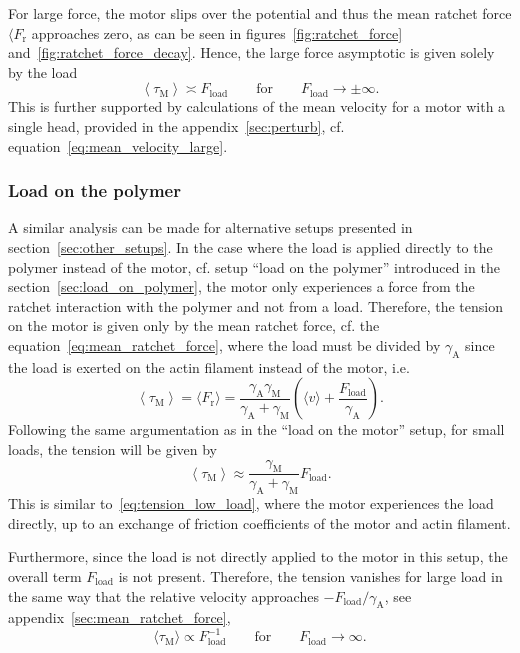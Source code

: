 \documentclass[aps,pre,twocolumn,showpacs,showkeys,superscriptaddress,floatfix]{revtex4-1}
\begin{document}
For large force, the motor slips over the potential and thus the mean ratchet force $\langle F_\text{r}$ approaches zero,
as can be seen in figures~\ref{fig:ratchet_force} and~\ref{fig:ratchet_force_decay}.
Hence, the large force asymptotic is given solely by the load
\begin{equation}
\left\langle \tau_\text{M} \right\rangle
\asymp F_\text{load} 
\qquad \text{for} \qquad F_\text{load} \to \pm \infty. 
\label{eq:tension_large_load}
\end{equation}
This is further supported by calculations of the mean velocity for a motor with a single head, provided in the appendix~\ref{sec:perturb}, cf. equation~\eqref{eq:mean_velocity_large}.


\subsubsection{Load on the polymer}
A similar analysis can be made for alternative setups presented in section~\ref{sec:other_setups}. 
In the case where the load is applied directly to the polymer instead of the motor, cf. setup ``load on the polymer'' introduced in the section~\ref{sec:load_on_polymer}, 
the motor only experiences a force from the ratchet interaction with the polymer and not from a load. 
Therefore, the tension on the motor is given only by the mean ratchet force,  
cf. the equation~\eqref{eq:mean_ratchet_force},  
where the load must be divided by $\gamma_\text{A}$ since the load is exerted on the actin filament instead of the motor,
i.e.
\begin{equation}
\left\langle \tau_\text{M} \right\rangle 
= \langle F_\text{r} \rangle 
= \frac{\gamma_\text{A}\gamma_\text{M}}{\gamma_\text{A} + \gamma_\text{M} } \left(\langle v \rangle + \frac{F_\text{load}}{\gamma_\text{A}}\right) . 
\label{eq:tension_load_on_polymer}
\end{equation}
Following the same argumentation as in the ``load on the motor'' setup, for small loads, the tension will be given by
\begin{equation}
\left\langle \tau_\text{M} \right\rangle
\approx \frac{\gamma_\text{M}}{\gamma_\text{A}+\gamma_\text{M}} F_\text{load}.
\label{eq:tension_low_load_on_polymer}
\end{equation}
This is similar to~\eqref{eq:tension_low_load}, where the motor experiences the load directly, up to an exchange of friction coefficients of the motor and actin filament. 

Furthermore, since the load is not directly applied to the motor in this setup, the overall term $F_\text{load}$ is not present. 
Therefore, the tension vanishes for large load in the same way that the relative velocity approaches $-F_\text{load} / \gamma_\text{A}$, see appendix~\ref{sec:mean_ratchet_force},
\begin{equation}
\langle \tau_\text{M} \rangle 
\propto
F_\text{load}^{-1}
\qquad\text{for}\qquad
F_\text{load} \to \infty 
.
\label{eq:tension_load_on_polymer_large}
\end{equation}
\end{document}
